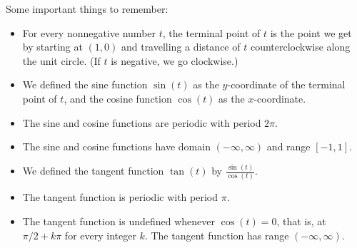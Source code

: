\documentclass[letterpaper,12pt,oneside]{book}
\theoremstyle{definition}
\begin{document}
{\begin{center}
\end{center}

\noindent
Some important things to remember:
\begin{itemize}
\item For every nonnegative number $t$, the terminal point of $t$ is the point we get by starting at $(1,0)$ and travelling a distance of $t$ counterclockwise along the unit circle.  (If $t$ is negative, we go clockwise.)
\item We defined the sine function $\sin(t)$ as the $y$-coordinate of the terminal point of $t$, and the cosine function $\cos(t)$ as the $x$-coordinate.
\item The sine and cosine functions are periodic with period $2\pi$.
\item The sine and cosine functions have domain $(-\infty,\infty)$ and range $[-1,1]$.
\item We defined the tangent function $\tan(t)$ by $\frac{\sin(t)}{\cos(t)}$.
\item The tangent function is periodic with period $\pi$.
\item The tangent function is undefined whenever $\cos(t)=0$, that is, at $\pi/2+k\pi$ for every integer $k$.  The tangent function has range $(-\infty,\infty)$.
\end{itemize}

}
\end{document}
